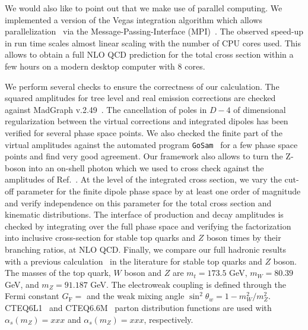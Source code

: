 \documentclass[preprint]{JHEP3} %
\begin{document}
We would also like to point out that we make use of parallel computing. 
We implemented a version of the Vegas integration algorithm which allows parallelization~\cite{} via the Message-Passing-Interface (MPI)~\cite{}. 
The observed speed-up in run time scales almost linear scaling with the number of CPU cores used. 
This allows to obtain a full NLO QCD prediction for the total cross section within a few hours on a modern desktop computer with 8 cores.

We perform several checks to ensure the correctness of our calculation. 
The squared amplitudes for tree level and real emission corrections are checked against MadGraph v.2.49~\cite{Stelzer:1994ta}. 
The cancellation of poles in $D-4$ of dimensional regularization between the virtual corrections and integrated dipoles has been verified for several phase space points.
We also checked the finite part of the virtual amplitudes against the automated program {\tt GoSam}~\cite{Cullen:2011ac} for a few phase space points and find
very good agreement. 
Our framework also allows to turn the Z-boson into an on-shell photon which we used to cross check against the amplitudes of Ref.~\cite{Melnikov.Scharf}. 
At the level of the integrated cross section, we vary the cut-off parameter for the finite dipole phase space by at least one order of magnitude and 
verify independence on this parameter for the total cross section and kinematic distributions.
The interface of production and decay amplitudes is checked by integrating over the full phase space and verifying the factorization into 
inclusive cross-section for stable top quarks and $Z$ boson times by their branching ratios, at NLO QCD.
% 
Finally, we compare our full hadronic results with a previous calculation~\cite{Garzelli:2012bn} in the literature for stable top quarks and $Z$ boson.
The masses of the top quark, $W$ boson and $Z$ are $m_t=173.5$ GeV, $m_W=80.39$ GeV, and $m_Z=91.187$ GeV. 
The electroweak coupling is defined through the Fermi constant $G_\mathrm{F}=$ and the weak mixing angle $\sin^2\theta_w = 1-m_W^2/m_Z^2$. 
CTEQ6L1~\cite{Pumplin:2002vw} and CTEQ6.6M~\cite{Nadolsky:2008zw} parton distribution functions are used with $\alpha_s(m_Z)=xxx$ and $\alpha_s(m_Z)=xxx$, respectively. 
\end{document}
